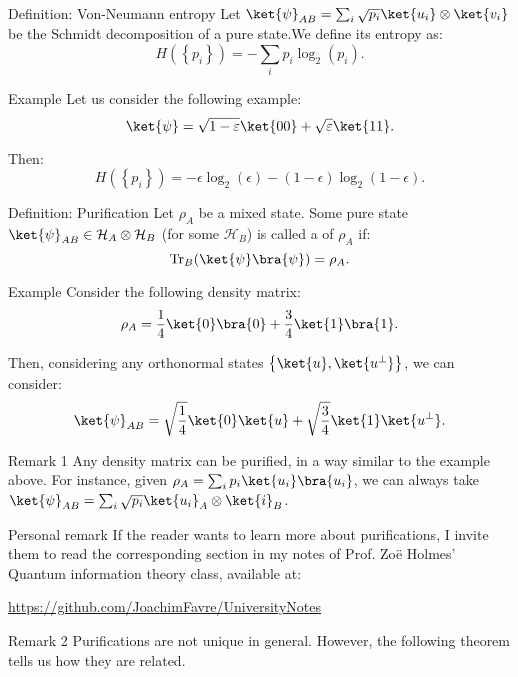 \documentclass[a4paper]{article}
\begin{document}
\begin{parag}{Definition: Von-Neumann entropy}
    Let $\ket{\psi}_{AB} = \sum_{i} \sqrt{p_i} \ket{u_i} \otimes \ket{v_i}$ be the Schmidt decomposition of a pure state.We define its  entropy as: 
    \[H\left(\left\{p_i\right\}\right) = -\sum_{i} p_i \log_2\left(p_i\right).\]
    
    \begin{subparag}{Example}
        Let us consider the following example:
        \[\ket{\psi} = \sqrt{1 - \epsilon} \ket{00} + \sqrt{\epsilon} \ket{11}.\]

        Then: 
        \[H\left(\left\{p_i\right\}\right) = -\epsilon \log_2\left(\epsilon\right) - \left(1 - \epsilon\right) \log_2\left(1 - \epsilon\right).\]
    \end{subparag}
\end{parag}

\begin{parag}{Definition: Purification}
    Let $\rho_A$ be a mixed state. Some pure state $\ket{\psi}_{AB} \in \mathcal{H}_A \otimes \mathcal{H}_B$ (for some $\mathcal{H}_B$) is called a  of $\rho_A$ if: 
    \[\Tr_B\left(\ket{\psi}\bra{\psi}\right) = \rho_A.\]
    
    \begin{subparag}{Example}
        Consider the following density matrix: 
        \[\rho_A = \frac{1}{4} \ket{0}\bra{0} + \frac{3}{4} \ket{1}\bra{1}.\]

        Then, considering any orthonormal states $\left\{\ket{u}, \ket{u^{\perp}}\right\}$, we can consider: 
        \[\ket{\psi}_{AB} = \sqrt{\frac{1}{4}} \ket{0} \ket{u} + \sqrt{\frac{3}{4}} \ket{1} \ket{u^{\perp}}.\]
    \end{subparag}

    \begin{subparag}{Remark 1}
        Any density matrix can be purified, in a way similar to the example above. For instance, given $\rho_A = \sum_{i} p_i \ket{u_i}\bra{u_i}$, we can always take $\ket{\psi}_{AB} = \sum_{i} \sqrt{p_i} \ket{u_i}_A \otimes \ket{i}_B$.
    \end{subparag}

    \begin{subparag}{Personal remark}
        If the reader wants to learn more about purifications, I invite them to read the corresponding section in my notes of Prof. Zoë Holmes' Quantum information theory class, available at:
        \begin{center}
            \url{https://github.com/JoachimFavre/UniversityNotes}
        \end{center}
    \end{subparag}

    \begin{subparag}{Remark 2}
        Purifications are not unique in general. However, the following theorem tells us how they are related.
    \end{subparag}
\end{parag}
\end{document}
